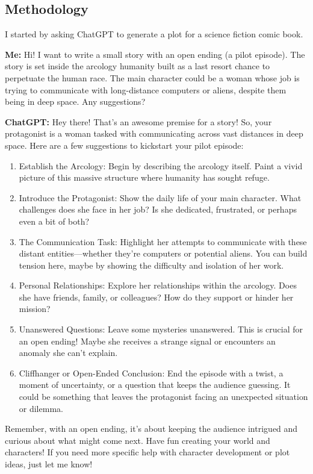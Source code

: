 \documentclass[a4paper,11pt]{article}
\newenvironment{shadedquotation1}
    {\colorlet{shadecolor}{JungleGreen!15}\begin{shaded*}
    \quoting[leftmargin=1cm, rightmargin=1cm, vskip=0pt]
    }
    {\endquoting
    \end{shaded*}
}
\begin{document}
\subsection{Methodology} 
I started by asking ChatGPT to generate a plot for a science fiction comic book. 
\begin{shadedquotation1}
    \noindent\textbf{Me:} Hi! I want to write a small story with an open ending (a pilot episode). The story is set inside the arcology humanity built as a last resort chance to perpetuate the human race. The main character could be a woman whose job is trying to communicate with long-distance computers or aliens, despite them being in deep space. Any suggestions?\bigskip

    \noindent\textbf{ChatGPT:} Hey there! That's an awesome premise for a story! So, your protagonist is a woman tasked with communicating across vast distances in deep space. Here are a few suggestions to kickstart your pilot episode:
    \begin{enumerate}
        \item Establish the Arcology: Begin by describing the arcology itself. Paint a vivid picture of this massive structure where humanity has sought refuge.
        \item Introduce the Protagonist: Show the daily life of your main character. What challenges does she face in her job? Is she dedicated, frustrated, or perhaps even a bit of both?
        \item The Communication Task: Highlight her attempts to communicate with these distant entities—whether they're computers or potential aliens. You can build tension here, maybe by showing the difficulty and isolation of her work.
        \item Personal Relationships: Explore her relationships within the arcology. Does she have friends, family, or colleagues? How do they support or hinder her mission?
        \item Unanswered Questions: Leave some mysteries unanswered. This is crucial for an open ending! Maybe she receives a strange signal or encounters an anomaly she can't explain.
        \item Cliffhanger or Open-Ended Conclusion: End the episode with a twist, a moment of uncertainty, or a question that keeps the audience guessing. It could be something that leaves the protagonist facing an unexpected situation or dilemma.
    \end{enumerate}
    Remember, with an open ending, it's about keeping the audience intrigued and curious about what might come next. Have fun creating your world and characters! If you need more specific help with character development or plot ideas, just let me know!
\end{shadedquotation1}
\end{document}

